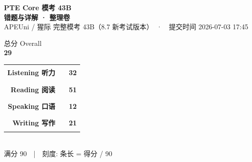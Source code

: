 
\begin{titlepage}
\thispagestyle{empty}
\centering
\vspace*{1.4cm}

{\fontsize{30}{36}\selectfont\bfseries\color{cHead} PTE Core 模考 43B}\\[4mm]
{\fontsize{17}{20}\selectfont\color{cAccent}\bfseries 错题与详解 · 整理卷}\\[3mm]
{\color{gray} APEUni / 猩际 完整模考 43B（8.7 新考试版本）　·　提交时间 2026-07-03 17:45}\\[1.2cm]

\begin{tcolorbox}[width=0.62\textwidth, halign=center, enhanced,
  colback=cAccent, colframe=cAccent, arc=6pt, boxrule=0pt, top=10pt, bottom=10pt]
  {\color{white}\large 总分 Overall}\\[2pt]
  {\fontsize{46}{50}\selectfont\bfseries\color{white} 29}
\end{tcolorbox}

\vspace{1.0cm}

\begin{tcolorbox}[width=0.84\textwidth, enhanced, colback=white, colframe=cRule,
  boxrule=0.8pt, arc=4pt, left=18pt, right=18pt, top=14pt, bottom=14pt]
\setlength{\tabcolsep}{6pt}\renewcommand{\arraystretch}{1.7}
\sffamily
\begin{tabular}{@{}r@{\hskip 8pt}l@{\hskip 10pt}l@{}}
 \bfseries Listening 听力 & {\color{mListen}\rule{3.56cm}{0.42cm}} & {\bfseries\large 32}\\
 \bfseries Reading 阅读   & {\color{mRead}\rule{5.67cm}{0.42cm}}   & {\bfseries\large 51}\\
 \bfseries Speaking 口语  & {\color{mSpeak}\rule{1.33cm}{0.42cm}}  & {\bfseries\large 12}\\
 \bfseries Writing 写作   & {\color{mWrite}\rule{2.33cm}{0.42cm}}  & {\bfseries\large 21}\\
\end{tabular}\\[2mm]
{\footnotesize\color{gray} 满分 90　|　刻度: 条长 = 得分 / 90}
\end{tcolorbox}

\vspace{0.8cm}


\end{titlepage}
